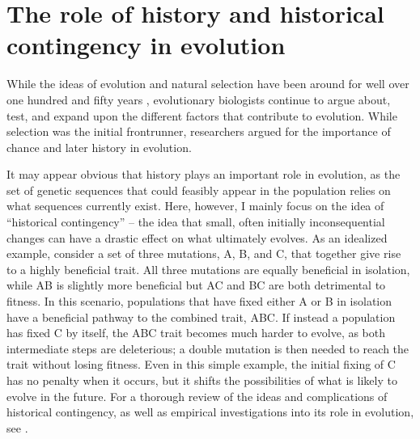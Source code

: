 \section{The role of history and historical contingency in evolution}

While the ideas of evolution and natural selection have been around for well over one hundred and fifty years \citep{darwin1859}, evolutionary biologists continue to argue about, test, and expand upon the different factors that contribute to evolution. 
While selection was the initial frontrunner, researchers argued for the importance of chance \citep{kimuraEvolutionaryRateMolecular1968, king1969non, mayrHowCarryOut1983} and later history \citep{gouldSpandrelsSanMarco1979, gouldWonderfulLifeBurgess1990} in evolution. 

It may appear obvious that history plays an important role in evolution, as the set of genetic sequences that could feasibly appear in the population relies on what sequences currently exist.
Here, however, I mainly focus on the idea of ``historical contingency'' -- the idea that small, often initially inconsequential changes can have a drastic effect on what ultimately evolves. 
As an idealized example, consider a set of three mutations, A, B, and C, that together give rise to a highly beneficial trait. 
All three mutations are equally beneficial in isolation, while AB is slightly more beneficial but AC and BC are both detrimental to fitness. 
In this scenario, populations that have fixed either A or B in isolation have a beneficial pathway to the combined trait, ABC. 
If instead a population has fixed C by itself, the ABC trait becomes much harder to evolve, as both intermediate steps are deleterious; a double mutation is then needed to reach the trait without losing fitness. 
Even in this simple example, the initial fixing of C has no penalty when it occurs, but it shifts the possibilities of what is likely to evolve in the future. 
For a thorough review of the ideas and complications of historical contingency, as well as empirical investigations into its role in evolution, see \citep{blountContingencyDeterminismEvolution2018}.

